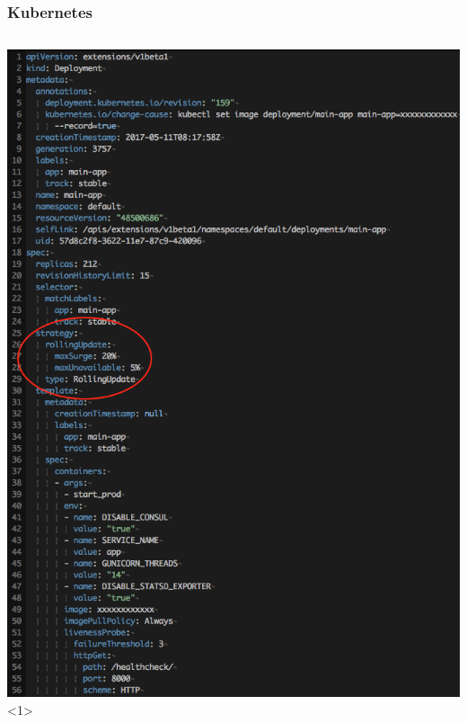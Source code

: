 \documentclass[12pt]{beamer}
\begin{document}
    \begin{frame}
        \frametitle{Kubernetes}
        \begin{columns}
            \begin{center}
                \includegraphics[width=1\textwidth]{images/kubernetes-config-rolling.png}<1>

\end{center}
\end{columns}
\end{frame}
\end{document}
